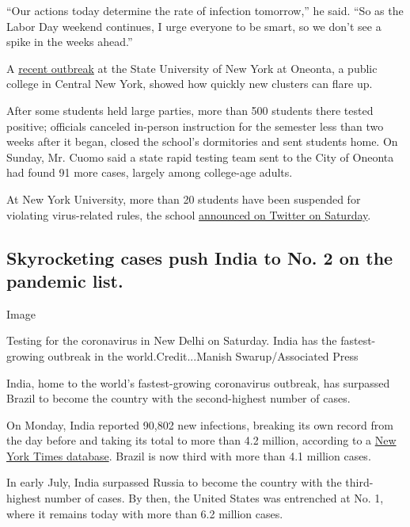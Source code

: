 ``Our actions today determine the rate of infection tomorrow,'' he said.
``So as the Labor Day weekend continues, I urge everyone to be smart, so
we don't see a spike in the weeks ahead.''

A
\href{https://slack-redir.net/link?url=https\%3A\%2F\%2Fwww.nytimes3xbfgragh.onion\%2F2020\%2F09\%2F03\%2Fnyregion\%2Fnew-york-suny-oneonta-coronavirus.html}{recent
outbreak} at the State University of New York at Oneonta, a public
college in Central New York, showed how quickly new clusters can flare
up.

After some students held large parties, more than 500 students there
tested positive; officials canceled in-person instruction for the
semester less than two weeks after it began, closed the school's
dormitories and sent students home. On Sunday, Mr. Cuomo said a state
rapid testing team sent to the City of Oneonta had found 91 more cases,
largely among college-age adults.

At New York University, more than 20 students have been suspended for
violating virus-related rules, the school
\href{https://twitter.com/nyuniversity/status/1302380699010433026}{announced
on Twitter on Saturday}.

\hypertarget{skyrocketing-cases-push-india-to-no-2-on-the-pandemic-list}{%
\subsection{Skyrocketing cases push India to No. 2 on the pandemic
list.}\label{skyrocketing-cases-push-india-to-no-2-on-the-pandemic-list}}

Image

Testing for the coronavirus in New Delhi on Saturday. India has the
fastest-growing outbreak in the world.Credit...Manish Swarup/Associated
Press

India, home to the world's fastest-growing coronavirus outbreak, has
surpassed Brazil to become the country with the second-highest number of
cases.

On Monday, India reported 90,802 new infections, breaking its own record
from the day before and taking its total to more than 4.2 million,
according to a
\href{https://www.nytimes3xbfgragh.onion/interactive/2020/world/asia/india-coronavirus-cases.html}{New
York Times database}. Brazil is now third with more than 4.1 million
cases.

In early July, India surpassed Russia to become the country with the
third-highest number of cases. By then, the United States was entrenched
at No. 1, where it remains today with more than 6.2 million cases.

